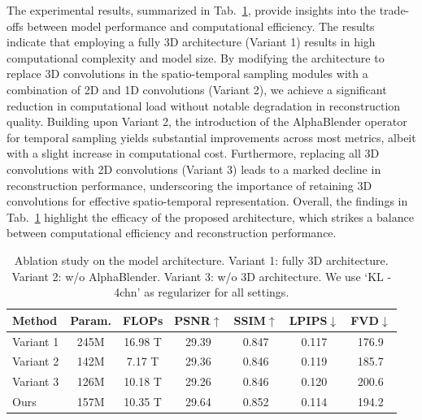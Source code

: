 \documentclass{article} %
\begin{document}
The experimental results, summarized in Tab.~\ref{tab:abla_arch}, provide insights into the trade-offs between model performance and computational efficiency. The results indicate that employing a fully 3D architecture (Variant 1) results in high computational complexity and model size. By modifying the architecture to replace 3D convolutions in the spatio-temporal sampling modules with a combination of 2D and 1D convolutions (Variant 2), we achieve a significant reduction in computational load without notable degradation in reconstruction quality. Building upon Variant 2, the introduction of the AlphaBlender operator for temporal sampling yields substantial improvements across most metrics, albeit with a slight increase in computational cost. Furthermore, replacing all 3D convolutions with 2D convolutions (Variant 3) leads to a marked decline in reconstruction performance, underscoring the importance of retaining 3D convolutions for effective spatio-temporal representation. Overall, the findings in Tab.~\ref{tab:abla_arch} highlight the efficacy of the proposed architecture, which strikes a balance between computational efficiency and reconstruction performance.

\begin{table}[t]
\begin{center}
\small
\caption{Ablation study on the model architecture. Variant 1: fully 3D architecture. Variant 2: w/o AlphaBlender. Variant 3: w/o 3D architecture. We use `KL - 4chn' as regularizer for all settings.}
	\label{tab:abla_arch}
        \setlength\tabcolsep{12pt}
	\begin{tabular}{l|cc|cccc}
		\toprule[1.5pt]
		Method  & Param. & FLOPs & PSNR$\uparrow$ & SSIM$\uparrow$ & LPIPS$\downarrow$  & FVD$\downarrow$ \\
		\midrule
		Variant 1 & 245M & 16.98 T& 29.39 & 0.847 & 0.117 & 176.9 \\
		Variant 2 & 142M & 7.17 T& 29.36 & 0.846 & 0.119  & 185.7 \\
		Variant 3 & 126M & 10.18 T& 29.26  & 0.846 &  0.120 & 200.6 \\
		  Ours & 157M & 10.35 T & 29.64 & 0.852 & 0.114 & 194.2  \\
		\bottomrule[1.5pt]
	\end{tabular}
 \vspace{-3mm}
\end{center}
\end{table}
\end{document}
